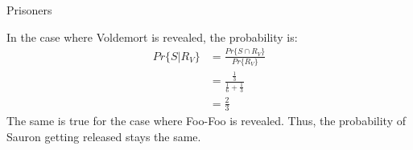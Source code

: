 \documentclass[../main.tex]{subfiles}
\begin{document}
\begin{questions}
  \pagebreak
  \question Prisoners
  \begin{solution}
    In the case where Voldemort is revealed, the probability is:
    \begin{align*}
      Pr\{S | R_V\} &= \frac{Pr\{S \cap R_V\}}{Pr\{R_V\}} \\
                    &= \frac{\frac{1}{3}}{\frac{1}{6} + \frac{1}{3}} \\
                    &= \frac{2}{3}
    \end{align*}
    The same is true for the case where Foo-Foo is revealed. Thus, the probability of Sauron getting released stays the same.
  \end{solution}

\end{questions}
\end{document}
